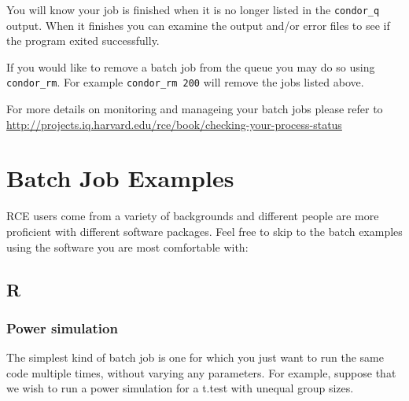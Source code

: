 \documentclass[
]{book}
\begin{document}
You will know your job is finished when it is no longer listed in the
\texttt{condor\_q} output. When it finishes you can examine the output and/or
error files to see if the program exited successfully.

If you would like to remove a batch job from the queue you may do so
using \texttt{condor\_rm}. For example \texttt{condor\_rm\ 200} will remove the jobs
listed above.

For more details on monitoring and manageing your batch jobs please
refer to
\url{http://projects.iq.harvard.edu/rce/book/checking-your-process-status}

\hypertarget{batch-job-examples}{%
\chapter{Batch Job Examples}\label{batch-job-examples}}

RCE users come from a variety of backgrounds and different people are
more proficient with different software packages. Feel free to skip to
the batch examples using the software you are most comfortable with:

\hypertarget{r-1}{%
\section{R}\label{r-1}}

\hypertarget{power-simulation}{%
\subsection{Power simulation}\label{power-simulation}}

The simplest kind of batch job is one for which you just want to run the
same code multiple times, without varying any parameters. For example,
suppose that we wish to run a power simulation for a t.test with unequal
group sizes.
\end{document}
